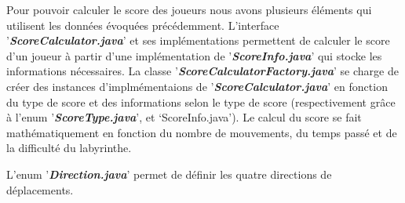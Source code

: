 Pour pouvoir calculer le score des joueurs nous avons plusieurs éléments qui
utilisent les données évoquées précédemment. L'interface '\textbf{\textit{ScoreCalculator.java}}'
et ses implémentations permettent de calculer le score d'un joueur à partir
d'une implémentation de '\textbf{\textit{ScoreInfo.java}}' qui stocke les informations
nécessaires. La classe '\textbf{\textit{ScoreCalculatorFactory.java}}' se charge de créer des
instances d'implmémentaions de '\textbf{\textit{ScoreCalculator.java}}' en fonction du type de
score et des informations selon le type de score (respectivement grâce à l'enum
'\textbf{\textit{ScoreType.java}}', et `ScoreInfo.java'). Le calcul du score se fait
mathématiquement en fonction du nombre de mouvements, du temps passé et de la
difficulté du labyrinthe.

L'enum  '\textbf{\textit{Direction.java}}' permet de définir les quatre directions de déplacements.
